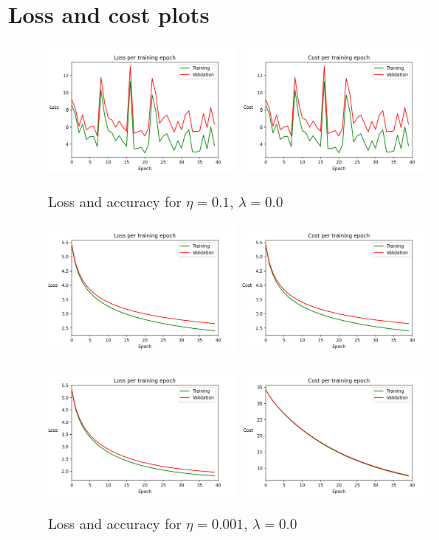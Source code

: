 \documentclass{article}
\begin{document}
\newpage
\subsection*{Loss and cost plots}
	\begin{figure}[h!]
		\centering
		\includegraphics[width=5cm]{../plots/loss_v1.png}
		\includegraphics[width=5cm]{../plots/cost_v1.png}
		\caption{Loss and accuracy for $\eta=0.1$, $\lambda=0.0$}
		\vspace{0.2cm}
		\includegraphics[width=5cm]{../plots/loss_v2.png}
		\includegraphics[width=5cm]{../plots/cost_v2.png}
		\caption{Loss and accuracy for $\eta=0.001$, $\lambda=0.0$}
		\vspace{0.2cm}
		\includegraphics[width=5cm]{../plots/loss_v3.png}
		\includegraphics[width=5cm]{../plots/cost_v3.png}

\end{figure}
\end{document}
